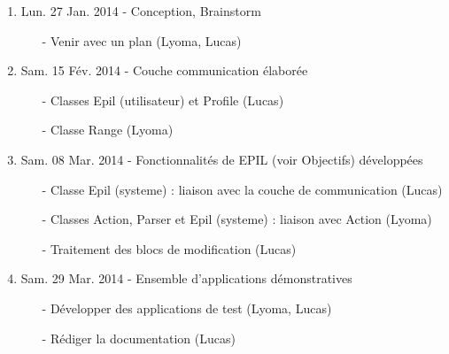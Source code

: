 \documentclass[12pt,a4paper]{article}
\begin{document}
\begin{enumerate}
\item Lun. 27 Jan. 2014 - Conception, Brainstorm
\begin{itemize}
\item[-] Venir avec un plan (Lyoma, Lucas)
\end{itemize}
\item Sam. 15 F\'{e}v. 2014 - Couche communication \'{e}labor\'{e}e
\begin{itemize}
\item[-] Classes Epil (utilisateur) et Profile (Lucas)
\item[-] Classe Range (Lyoma)
\end{itemize}
\item Sam. 08 Mar. 2014 - Fonctionnalit\'{e}s de EPIL (voir Objectifs) d\'{e}velopp\'{e}es
\begin{itemize}
\item[-] Classe Epil (systeme) : liaison avec la couche de communication (Lucas)
\item[-] Classes Action, Parser et Epil (systeme) : liaison avec Action (Lyoma)
\item[-] Traitement des blocs de modification (Lucas)
\end{itemize}
\item Sam. 29 Mar. 2014 - Ensemble d'applications d\'{e}monstratives
\begin{itemize}
\item[-] D\'{e}velopper des applications de test (Lyoma, Lucas)
\item[-] R\'{e}diger la documentation (Lucas)
\end{itemize}
\end{enumerate}
\end{document}
